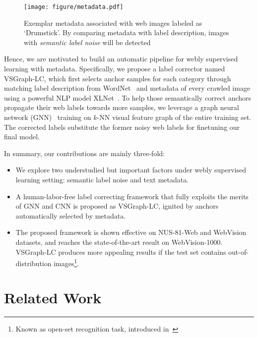 \documentclass[sigconf]{acmart}
\begin{document}
\begin{figure}
	\centering
\texttt{[image: figure/metadata.pdf]}
	\caption{Exemplar metadata associated with web images labeled as `Drumstick'. 
	By comparing metadata with label description, images with \textit{semantic label noise} will be detected}
	\label{fig:text}
\end{figure}

Hence, we are motivated to build an automatic pipeline for webly supervised learning with metadata. Specifically, we propose a label corrector named VSGraph-LC, which first selects anchor samples for each category through matching label description from WordNet~\cite{miller1998wordnet} and metadata of every crawled image using a powerful NLP model XLNet~\cite{yang2019xlnet}. To help those semantically correct anchors propagate their web labels towards more samples, we leverage a graph neural network (GNN)~\cite{kipf2016gcn} training on $k$-NN visual feature graph of the entire training set.
The corrected labels substitute the former noisy web labels 
for finetuning our final model.

In summary, our contributions are mainly three-fold:
\begin{itemize}
    \item We explore two understudied but important factors under webly supervised learning setting: semantic label noise and text metadata.
    \item A human-labor-free label correcting framework that fully exploits the merits of GNN and CNN is proposed as VSGraph-LC, ignited by anchors automatically selected by metadata.
    \item The proposed framework is shown effective on NUS-81-Web and WebVision datasets, and reaches the state-of-the-art result on WebVision-1000. VSGraph-LC produces more appealing results if the test set contains out-of-distribution images\footnote{Known as open-set recognition task, introduced in~\cite{kuznetsova2018open}}.
\end{itemize}

\section{Related Work}
\label{sec:related}
\end{document}
